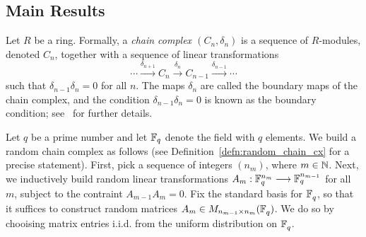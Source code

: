 \subsection*{Main Results}

Let $R$ be a ring.  Formally, a {\em chain complex $(C_n, \delta_n)$ } is a
sequence of $R$-modules, denoted $C_n$, together with a sequence of linear
transformations 
\[
  \cdots \xrightarrow{\delta_{n+1}} C_n \xrightarrow{\delta_n}
  C_{n-1} \xrightarrow{\delta_{n-1}} \cdots
\]
such that $\delta_{n-1}\delta_n = 0$ for all $n$. The maps $\delta_n$ are called the boundary maps of the chain
complex, and the condition $\delta_{n-1} \delta_n = 0$ is known as the boundary
condition; see~\cite{hatcher2002algebraic} for further details.

%

Let $q$ be a prime number and let $\mathbb{F}_q$ denote the field with $q$ elements.
We build a random chain complex as follows (see Definition~\ref{defn:random_chain_cx}
for a precise statement). First, pick a 
sequence of integers $(n_m)$, where $m \in \mathbb{N}$. Next, we inductively
build random linear transformations $A_m : \mathbb{F}_q^{n_m} \longrightarrow \mathbb{F}_q^{n_{m-1}}$
for all $m$, subject to the contraint $A_{m-1} A_m = 0$. Fix the 
standard basis for $\mathbb{F}_q^{}$, so that it suffices to construct random
matrices $A_m \in M_{n_{m-1} \times n_m}(\mathbb{F}_q^{})$. We do so by 
chooising matrix entries i.i.d. from the uniform distribution on
$\mathbb{F}_q^{}$. 


